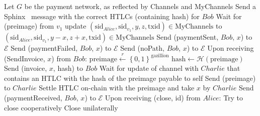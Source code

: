 \begin{algorithmic}[1]
      \State Let $G$ be the payment network, as reflected by Channels and MyChannels
        \State Send a Sphinx~\cite{sphinx} message with the correct HTLCs (containing
        hash) for $Bob$
        \State {}
        \State Wait for (preimage) from $v_1$
          \State update $\left(\mathrm{sid}_{Alice}, \mathrm{sid}_{v_1}, y, z,
          \mathrm{txid}\right) \in \mathrm{MyChannels}$ to $\left(\mathrm{sid}_{Alice},
          \mathrm{sid}_{v_1}, y - x, z + x, \mathrm{txid}\right) \in \mathrm{MyChannels}$
          \State Send (paymentSent, $Bob$, $x$) to $\mathcal{E}$
        \Else
          \State Send (paymentFailed, $Bob$, $x$) to $\mathcal{E}$
        \EndIf
      \Else
        \State Send (noPath, $Bob$, $x$) to $\mathcal{E}$
      \EndIf
    \State
    \State Upon receiving (SendInvoice, $x$) from $Bob$:
      \State $\mathrm{preimage} \overset{r}{\leftarrow}
      \left\{0,1\right\}^{\mathrm{gazillion}}$
      \State $\mathrm{hash} \leftarrow \mathcal{H}\left(\mathrm{preimage}\right)$
      \State Send (invoice, $x$, hash) to $Bob$
      \State Wait for update of channel with $Charlie$ that contains an HTLC with the hash
      of the preimage payable to self
      \State Send (preimage) to $Charlie$
        \State Settle HTLC on-chain with the preimage and take $x$ by $Charlie$
      \EndIf
      \State Send (paymentReceived, $Bob$, $x$) to $\mathcal{E}$
    \State
    \State Upon receiving (close, id) from $Alice$:
        \State Try to close cooperatively 
         
          \State Close unilaterally 
        \EndIf
      \EndIf
  \end{algorithmic}
\hrulefill
